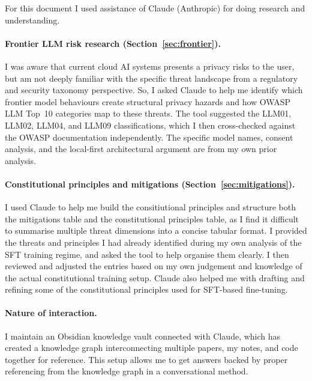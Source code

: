 \documentclass[11pt,a4paper]{article}
\begin{document}
For this document I used assistance of Claude (Anthropic) for doing research and understanding.

\paragraph{Frontier LLM risk research (Section~\ref{sec:frontier}).}
I was aware that current cloud AI systems presents a privacy risks to the user, but am not deeply familiar with the specific threat landscape from a regulatory and security taxonomy perspective. So, I asked Claude to help me identify which frontier model behaviours create structural privacy hazards and how OWASP LLM Top~10 categories map to these threats. The tool suggested the LLM01, LLM02, LLM04, and LLM09 classifications, which I then cross-checked against the OWASP documentation independently. The specific model names, consent analysis, and the local-first architectural argument are from my own prior analysis.

\paragraph{Constitutional principles and mitigations (Section~\ref{sec:mitigations}).}
I used Claude to help me build the consitiutional principles and structure both the mitigations table and the constitutional principles table, as I find it difficult to summarise multiple threat dimensions into a concise tabular format. I provided the threats and principles I had already identified during my own analysis of the SFT training regime, and asked the tool to help organise them clearly. I then reviewed and adjusted the entries based on my own judgement and knowledge of the actual constitutional training setup. Claude also helped me with drafting and refining some of the constitutional principles used for SFT-based fine-tuning.

\paragraph{Nature of interaction.}
I maintain an Obsidian knowledge vault connected with Claude, which has created a knowledge graph interconnecting multiple papers, my notes, and code together for reference. This setup allows me to get answers backed by proper referencing from the knowledge graph in a conversational method.
\end{document}
